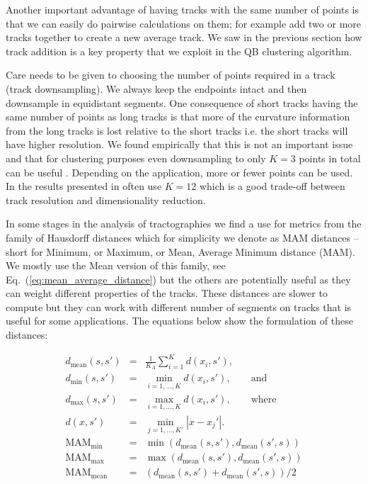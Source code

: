 \documentclass{bioinfo}
\begin{document}
\begin{methods}
Another important advantage of having tracks with the same number of points is
that we can easily do pairwise calculations on them; for example add two or more
tracks together to create a new average track. We saw in the previous section
how track addition is a key property that we exploit in the QB clustering
algorithm.

Care needs to be given to choosing the number of points required in a
track (track downsampling). We always keep the endpoints intact and then
downsample in equidistant segments. One consequence of short tracks
having the same number of points as long tracks is that more of the
curvature information from the long tracks is lost relative to the short
tracks i.e. the short tracks will have higher resolution.  We found
empirically that this is not an important issue and that for clustering
purposes even downsampling to only $K=3$ points in total can be useful
\cite{EGMB10}. Depending on the application, more or fewer points can
be used. In the results presented in often use $K=12$ which is a good trade-off 
between track resolution and dimensionality reduction.

In some stages in the analysis of tractographies we find a use for
metrics from the family of Hausdorff distances which for simplicity we
denote as MAM distances -- short for Minimum, or Maximum, or Mean,
Average Minimum distance (MAM). We mostly use the Mean version of this
family, see Eq.~(\ref{eq:mean_average_distance}) but the others are
potentially useful as they can weight different properties of the
tracks. These distances are slower to compute but they can work with
different number of segments on tracks that is useful for some
applications. The equations below show the formulation of these
distances:

\begin{eqnarray}
d_{\textrm{mean}}(s,s') & = & \frac{1}{K_{A}}\sum_{i=1}^{K}d(x_{i},s'),\nonumber \\
d_{\textrm{min}}(s,s') & = & \min_{i=1,...,K}d(x_{i},s'),\qquad\textrm{and}\label{eq:minimum_distance}\\
d_{\textrm{max}}(s,s') & = & \max_{i=1,...,K }d(x_{i},s'),\qquad\textrm{where}\label{eq:maximum distance}\\
d(x,s') & = & \min_{j=1,...,K'}|x-x_{j}'|.\nonumber \\
\textrm{MAM}_{\textrm{min}} & = & \min(d_{\textrm{mean}}(s,s'),d_{\textrm{mean}}(s',s))\label{eq:min_average_distance}\\
\textrm{MAM}_{\textrm{max}} & = & \max(d_{\textrm{mean}}(s,s'),d_{\textrm{mean}}(s',s))\nonumber \\
\textrm{MAM}_{\textrm{mean}} & = & (d_{\textrm{mean}}(s,s')+d_{\textrm{mean}}(s',s))/2\label{eq:mean_average_distance}\end{eqnarray}



\end{methods}
\end{document}
